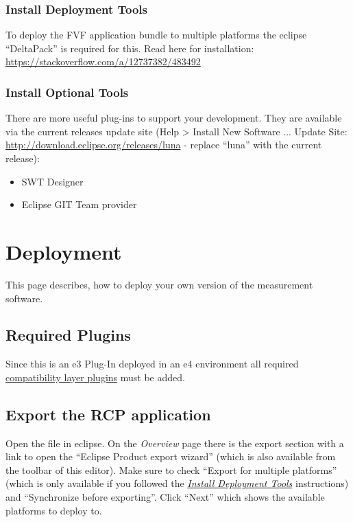 \subsection{Install Deployment Tools}
\label{development/setup:setup-deltapack}\label{development/setup:install-deployment-tools}
To deploy the FVF application bundle to multiple platforms the eclipse ``DeltaPack'' is required for this.
Read here for installation: \href{https://stackoverflow.com/a/12737382/483492}{https://stackoverflow.com/a/12737382/483492}


\subsection{Install Optional Tools}
\label{development/setup:install-optional-tools}
There are more useful plug-ins to support your development. They are available via the current releases update site (Help \textgreater{} Install New Software ... Update Site: \href{http://download.eclipse.org/releases/luna}{http://download.eclipse.org/releases/luna} - replace ``luna'' with the current release):
\begin{itemize}
\item {} 
SWT Designer

\item {} 
Eclipse GIT Team provider

\end{itemize}


\chapter{Deployment}
\label{development/deployment::doc}\label{development/deployment:deployment}
This page describes, how to deploy your own version of the measurement software.


\section{Required Plugins}
\label{development/deployment:required-plugins}
Since this is an e3 Plug-In deployed in an e4 environment all required \href{https://www.eclipse.org/community/eclipse\_newsletter/2013/february/article3.php\#compatibiliylayer\_plugins}{compatibility layer plugins} must be added.


\section{Export the RCP application}
\label{development/deployment:export-the-rcp-application}\label{development/deployment:compatibility-layer-plugins}
Open the  file in eclipse. On the \emph{Overview} page there is the export section with a link to open the ``Eclipse Product export wizard'' (which is also available from the toolbar of this editor). Make sure to check ``Export for multiple platforms'' (which is only available if you followed the {\hyperref[development/setup:setup-deltapack]{\emph{Install Deployment Tools}}} instructions) and ``Synchronize before exporting''. Click ``Next'' which shows the available platforms to deploy to.


